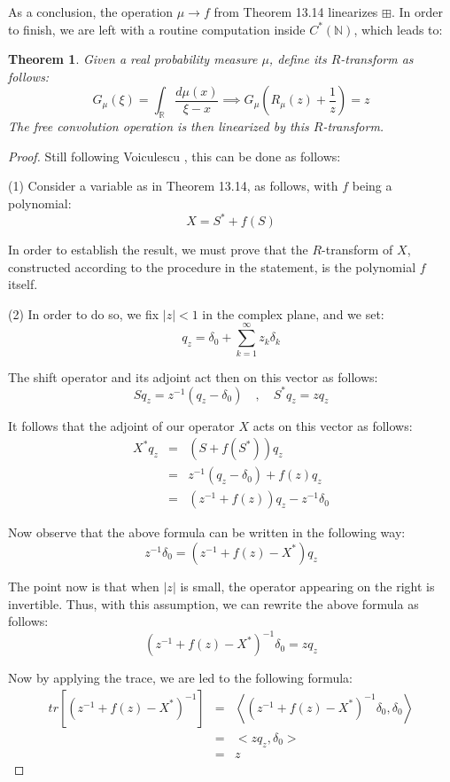 \documentclass[12pt]{amsbook}
\newtheorem{theorem}{Theorem}[chapter]
\begin{document}
As a conclusion, the operation $\mu\to f$ from Theorem 13.14 linearizes $\boxplus$. In order to finish, we are left with a routine computation inside $C^*(\mathbb N)$, which leads to:


\begin{theorem}
Given a real probability measure $\mu$, define its $R$-transform as follows:
$$G_\mu(\xi)=\int_\mathbb R\frac{d\mu(x)}{\xi-x}\implies G_\mu\left(R_\mu(z)+\frac{1}{z}\right)=z$$
The free convolution operation is then linearized by this $R$-transform.
\end{theorem}

\begin{proof}
Still following Voiculescu \cite{vo1}, this can be done as follows:

\medskip

(1) Consider a variable as in Theorem 13.14, as follows, with $f$ being a polynomial:
$$X=S^*+f(S)$$

In order to establish the result, we must prove that the $R$-transform of $X$, constructed according to the procedure in the statement, is the polynomial $f$ itself.

\medskip

(2) In order to do so, we fix $|z|<1$ in the complex plane, and we set:
$$q_z=\delta_0+\sum_{k=1}^\infty z_k\delta_k$$

The shift operator and its adjoint act then on this vector as follows:
$$Sq_z=z^{-1}(q_z-\delta_0)\quad,\quad 
S^*q_z=zq_z$$

It follows that the adjoint of our operator $X$ acts on this vector as follows:
\begin{eqnarray*}
X^*q_z
&=&(S+f(S^*))q_z\\
&=&z^{-1}(q_z-\delta_0)+f(z)q_z\\
&=&(z^{-1}+f(z))q_z-z^{-1}\delta_0
\end{eqnarray*}

Now observe that the above formula can be written in the following way:
$$z^{-1}\delta_0=(z^{-1}+f(z)-X^*)q_z$$

The point now is that when $|z|$ is small, the operator appearing on the right is invertible. Thus, with this assumption, we can rewrite the above formula as follows:
$$(z^{-1}+f(z)-X^*)^{-1}\delta_0=zq_z$$

Now by applying the trace, we are led to the following formula:
\begin{eqnarray*}
tr\left[(z^{-1}+f(z)-X^*)^{-1}\right]
&=&\left<(z^{-1}+f(z)-X^*)^{-1}\delta_0,\delta_0\right>\\
&=&<zq_z,\delta_0>\\
&=&z
\end{eqnarray*}


\end{proof}
\end{document}
